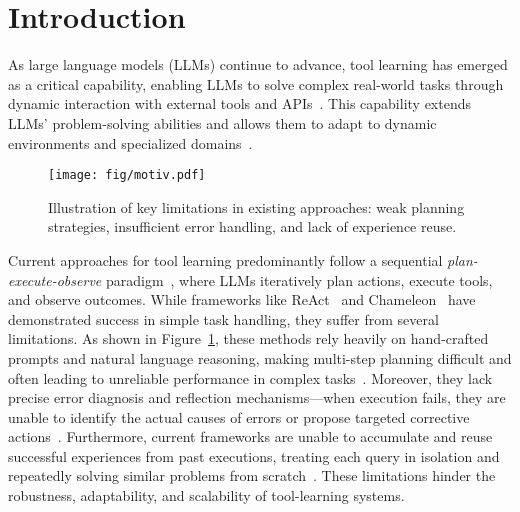 \section{Introduction}
As large language models (LLMs) continue to advance, tool learning has emerged as a critical capability, enabling LLMs to solve complex real-world tasks through dynamic interaction with external tools and APIs~\cite{DBLP:journals/corr/abs-2405-17935}. This capability extends LLMs' problem-solving abilities and allows them to adapt to dynamic environments and specialized domains~\cite{DBLP:conf/iclr/00020LCYPJ24}.

\begin{figure}[t]
    \centering
    \texttt{[image: fig/motiv.pdf]}
    \caption{Illustration of key limitations in existing approaches: weak planning strategies, insufficient error handling, and lack of experience reuse.}
    \label{fig:intro}
    \vspace{-0.6cm}
\end{figure}


Current approaches for tool learning predominantly follow a sequential \textit{plan-execute-observe} paradigm~\cite{DBLP:conf/iclr/YaoZYDSN023,DBLP:journals/corr/abs-2303-09014,DBLP:conf/nips/LuPCGCWZG23}, where LLMs iteratively plan actions, execute tools, and observe outcomes. 
While frameworks like ReAct~\cite{DBLP:conf/iclr/YaoZYDSN023} and Chameleon~\cite{DBLP:conf/nips/LuPCGCWZG23} have demonstrated success in simple task handling, they suffer from several limitations. 
As shown in Figure~\ref{fig:intro}, these methods rely heavily on hand-crafted prompts and natural language reasoning, making multi-step planning difficult and often leading to unreliable performance in complex tasks~\cite{DBLP:journals/corr/abs-2407-03007,DBLP:conf/icml/WangCY0L0J24}.
Moreover, they lack precise error diagnosis and reflection mechanisms—when execution fails, they are unable to identify the actual causes of errors or propose targeted corrective actions~\cite{DBLP:conf/icml/WangCY0L0J24,wang-etal-2024-llms-imaginarium}. 
Furthermore, current frameworks are unable to accumulate and reuse successful experiences from past executions, treating each query in isolation and repeatedly solving similar problems from scratch~\cite{DBLP:conf/iclr/YuanC000J24}.
These limitations hinder the robustness, adaptability, and scalability of tool-learning systems.

